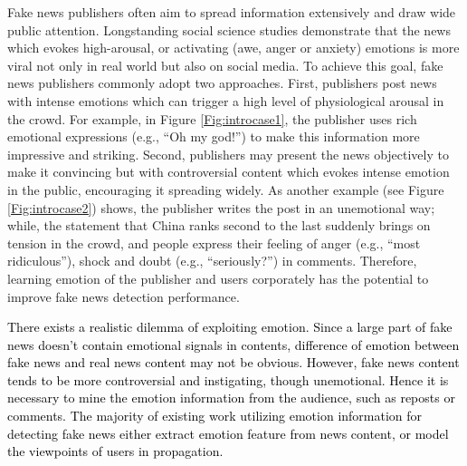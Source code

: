 \documentclass[conference]{IEEEtran}
\newcommand{\new}[1]{\textcolor{black}{{#1}}}
\begin{document}
	Fake news publishers often aim to spread information extensively and draw wide public attention. Longstanding social science studies demonstrate that the news which evokes high-arousal, or activating (awe, anger or anxiety) emotions is more viral not only in real world but also on social media\cite{stieglitz2013emotions,ferrara2015quantifying,rosnow1991inside,frijda2010impulsive,lazarus1984stress}.  To achieve this goal, fake news publishers commonly adopt two approaches. First, publishers post news with intense emotions which can trigger a high level of physiological arousal in the crowd. For example, in Figure \ref{Fig:introcase1}, the publisher uses rich emotional expressions (e.g., ``Oh my god!'') to make this information more impressive and striking. Second, publishers may present the news objectively to make it convincing but with controversial content which evokes intense emotion in the public, encouraging it spreading widely. As another example (see Figure \ref{Fig:introcase2}) shows, the publisher writes the post in an unemotional way; while, the statement that China ranks second to the last suddenly brings on tension in the crowd, and people express their feeling of anger (e.g., ``most ridiculous''), shock and doubt (e.g., ``seriously?'') in comments.
	Therefore, learning emotion of the publisher and  users corporately has the potential to improve fake news detection performance.
	 
	\new{There exists a realistic dilemma of exploiting emotion. Since a large part of fake news doesn't contain emotional signals in contents, difference of emotion between fake news and real news content may not be obvious. However, fake news content tends to be more controversial and instigating, though unemotional. Hence it is necessary to mine the emotion information from the audience, such as reposts or comments. The majority of existing work utilizing emotion information for detecting fake news either extract emotion feature from news content\cite{castillo2011information,guo2018rumor}, or model the viewpoints of users in propagation\cite{jin2016news, tacchini2017some}.}
	
\end{document}
